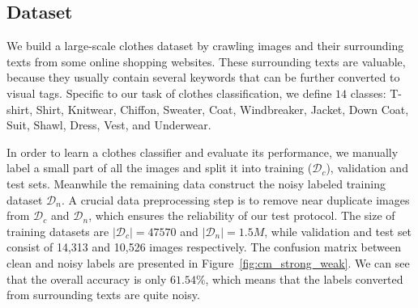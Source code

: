 \documentclass[10pt,twocolumn,letterpaper]{article}
\begin{document}
\subsection{Dataset} %
\label{sub:dataset}
We build a large-scale clothes dataset by crawling images and their surrounding texts from some online shopping websites. These surrounding texts are valuable, because they usually contain several keywords that can be further converted to visual tags. Specific to our task of clothes classification, we define $14$ classes: T-shirt, Shirt, Knitwear, Chiffon, Sweater, Coat, Windbreaker, Jacket, Down Coat, Suit, Shawl, Dress, Vest, and Underwear.

In order to learn a clothes classifier and evaluate its performance, we manually label a small part of all the images and split it into training ($\mathcal{D}_c$), validation and test sets. Meanwhile the remaining data construct the noisy labeled training dataset $\mathcal{D}_n$. A crucial data preprocessing step is to remove near duplicate images from $\mathcal{D}_c$ and $\mathcal{D}_n$, which ensures the reliability of our test protocol. The size of training datasets are $|\mathcal{D}_c| = 47570$ and $|\mathcal{D}_n| = 1.5M$, while validation and test set consist of 14,313 and 10,526 images respectively. The confusion matrix between clean and noisy labels are presented in Figure~\ref{fig:cm_strong_weak}. We can see that the overall accuracy is only $61.54\%$, which means that the labels converted from surrounding texts are quite noisy.
\end{document}
